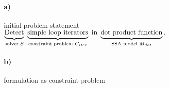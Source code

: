 
\paragraph*{a)} initial problem statement\\[1em]
{\LARGE$\underbrace{\text{Detect\vphantom{p}}}
                  _{\text{solver }S}
      \ \underbrace{\text{simple loop iterators}}
                  _{\text{constraint problem }C_{iter}}
                  \ \text{in}
      \ \underbrace{\text{dot product function}}
                  _{\text{SSA model }M_{dot}}
                    \text{.}$}\\

\paragraph*{b)} formulation as constraint problem\\
